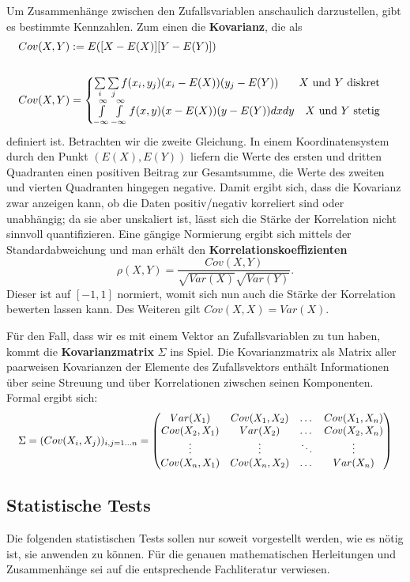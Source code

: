 Um Zusammenhänge zwischen den Zufallsvariablen anschaulich darzustellen, gibt es bestimmte Kennzahlen. Zum einen die \textbf{Kovarianz}, die als
\begin{align*}
	Cov(X,Y) &:= E([X-E(X)][Y-E(Y)])\\
	\\
	Cov(X,Y) &= 
		\begin{cases}
		\sum\limits_i \sum\limits_j f(x_i,y_j)(x_i-E(X))(y_j-E(Y)) \hfill X \text{ und } Y \text{ diskret}\\
		\int\limits_{-\infty}^{\infty} \int\limits_{-\infty}^{\infty} f(x,y)(x-E(X))(y-E(Y))dxdy\quad X \text{ und } Y \text{ stetig}\\
		\end{cases}
\end{align*}
definiert ist. Betrachten wir die zweite Gleichung. In einem Koordinatensystem
durch den Punkt \((E(X),E(Y))\) liefern die Werte des ersten und dritten
Quadranten einen positiven Beitrag zur Gesamtsumme, die Werte des zweiten und
vierten Quadranten hingegen negative. Damit ergibt sich, dass die Kovarianz
zwar anzeigen kann, ob die Daten positiv/negativ korreliert sind oder
unabhängig; da sie aber unskaliert ist, lässt sich die Stärke der Korrelation
nicht sinnvoll quantifizieren.
Eine gängige Normierung ergibt sich mittels der Standardabweichung und man erhält den \textbf{Korrelationskoeffizienten} 
\[
	\rho(X,Y) = \frac{Cov(X,Y)}{\sqrt{Var(X)} \sqrt{Var(Y)}}.
\] 
Dieser ist auf \([-1,1]\) normiert, womit sich nun auch die Stärke der Korrelation bewerten lassen kann. Des Weiteren gilt \(Cov(X,X)=Var(X)\).

Für den Fall, dass wir es mit einem Vektor an Zufallsvariablen zu tun haben, kommt die \textbf{Kovarianzmatrix} \(\Sigma\) ins Spiel. Die Kovarianzmatrix als Matrix aller paarweisen Kovarianzen der Elemente des Zufallsvektors enthält Informationen über seine Streuung und über Korrelationen ziwschen seinen Komponenten.
Formal ergibt sich:
\[
	\resizebox{\textwidth}{!}{
		\(\Sigma = (Cov(X_i,X_j))_{i,j = 1\dots n} = 
		\begin{pmatrix}
			Var(X_1) & Cov(X_1,X_2) &\dots & Cov(X_1,X_n)\\
			Cov(X_2,X_1)& Var(X_2) &\dots & Cov(X_2,X_n)\\
			\vdots &\vdots &\ddots &\vdots\\
			Cov(X_n,X_1) & Cov(X_n,X_2) &\dots &Var(X_n)
		\end{pmatrix}\)
	}
\] 

\subsection{Statistische Tests}
Die folgenden statistischen Tests sollen nur soweit vorgestellt werden, wie es nötig ist, sie anwenden zu können.
Für die genauen mathematischen Herleitungen und Zusammenhänge sei auf die entsprechende Fachliteratur verwiesen.

